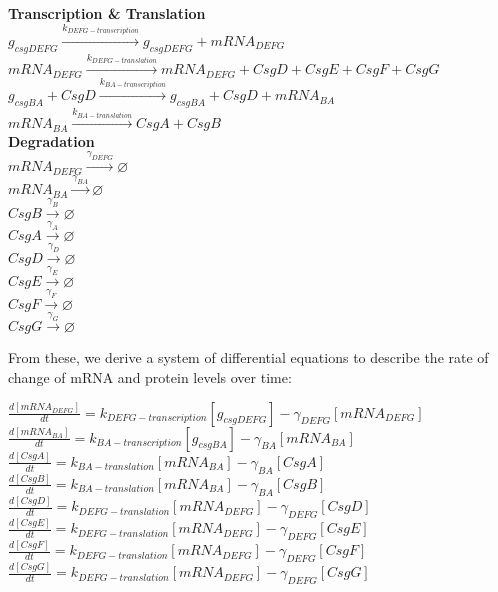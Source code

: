 \documentclass[11pt, oneside]{article}   	%
\begin{document}
\begin{center}
\textbf{Transcription \& Translation} \\
\bigskip
$g_{csgDEFG} \xrightarrow{k_{DEFG-transcription}}  g_{csgDEFG} + mRNA_{DEFG}$ \\
\bigskip
$mRNA_{DEFG} \xrightarrow{k_{DEFG-translation}} mRNA_{DEFG} + CsgD + CsgE + CsgF + CsgG$ \\
\bigskip
$g_{csgBA} + CsgD \xrightarrow{k_{BA-transcription}}  g_{csgBA} + CsgD + mRNA_{BA} $ \\
\bigskip
$mRNA_{BA} \xrightarrow{k_{BA-translation}} CsgA + CsgB$ \\ 

\hfill \break
\textbf{Degradation} \\
\bigskip
$mRNA_{DEFG} \xrightarrow{\gamma_{DEFG}} \varnothing$ \\ 
\bigskip
$mRNA_{BA} \xrightarrow{\gamma_{BA}}  \varnothing$ \\ 
\bigskip
$CsgB \xrightarrow{\gamma_{B}}  \varnothing$ \\ 
\bigskip
$CsgA \xrightarrow{\gamma_{A}}  \varnothing$ \\
\bigskip
$CsgD \xrightarrow{\gamma_{D}}  \varnothing$ \\
\bigskip
$CsgE \xrightarrow{\gamma_{E}}  \varnothing$ \\
\bigskip
$CsgF \xrightarrow{\gamma_{F}}  \varnothing$ \\
\bigskip
$CsgG \xrightarrow{\gamma_{G}}  \varnothing$ \\

\end{center}

From these, we derive a system of differential equations to describe the rate of change of mRNA and protein levels over time:

\begin{center}
$\frac{d[mRNA_{DEFG}]}{dt} = k_{DEFG-transcription}[g_{csgDEFG}] - \gamma_{DEFG}[mRNA_{DEFG}]$ \\
\bigskip
$\frac{d[mRNA_{BA}]}{dt} = k_{BA-transcription}[g_{csgBA}] - \gamma_{BA}[mRNA_{BA}]$ \\
\bigskip
$\frac{d[CsgA]}{dt} = k_{BA-translation}[mRNA_{BA}] - \gamma_{BA}[CsgA]$ \\
\bigskip
$\frac{d[CsgB]}{dt} =  k_{BA-translation}[mRNA_{BA}] - \gamma_{BA}[CsgB]$ \\
\bigskip
$\frac{d[CsgD]}{dt} =  k_{DEFG-translation}[mRNA_{DEFG}] - \gamma_{DEFG}[CsgD]$ \\
\bigskip
$\frac{d[CsgE]}{dt} =  k_{DEFG-translation}[mRNA_{DEFG}] - \gamma_{DEFG}[CsgE]$ \\
\bigskip
$\frac{d[CsgF]}{dt} =  k_{DEFG-translation}[mRNA_{DEFG}] - \gamma_{DEFG}[CsgF]$ \\
\bigskip
$\frac{d[CsgG]}{dt} =  k_{DEFG-translation}[mRNA_{DEFG}] - \gamma_{DEFG}[CsgG]$ \\

\end{center}
\end{document}
